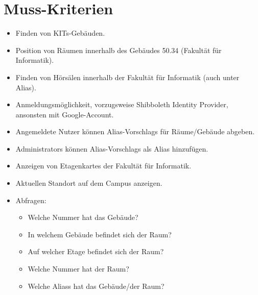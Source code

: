 \section{Muss-Kriterien}

\begin{itemize}

    \item \label{/MK10/}Finden von \Glspl{KIT}-Gebäuden.
    \item \label{/MK20/}Position von Räumen innerhalb des Gebäudes 50.34 (Fakultät für Informatik).
    \item \label{/MK30/}Finden von Hörsälen innerhalb der Fakultät für Informatik (auch unter Alias).
    \item \label{/MK40/}Anmeldungsmöglichkeit, vorzugsweise Shibboleth Identity Provider, ansonsten mit Google-Account.
    \item \label{/MK50/}Angemeldete Nutzer können \Glspl{Alias-Vorschlag} für Räume/Gebäude abgeben.
    \item \label{/MK60/}\Glspl{Administrator} können \Glspl{Alias-Vorschlag} als \Gls{Alias} hinzufügen.
    \item \label{/MK70/}Anzeigen von \Glspl{Etagenkarte} der Fakultät für Informatik.
    \item \label{/MK80/}Aktuellen Standort auf dem \Gls{Campus} anzeigen.
    \item Abfragen:
        \begin{itemize}
            \label{/MK90/}\item Welche Nummer hat das Gebäude?
            \label{/MK91/}\item In welchem Gebäude befindet sich der Raum?
            \label{/MK92/}\item Auf welcher Etage befindet sich der Raum?
            \label{/MK93/}\item Welche Nummer hat der Raum?
            \label{/MK94/}\item Welche \Glspl{Alias} hat das Gebäude/der Raum?
        \end{itemize}

\end{itemize}
